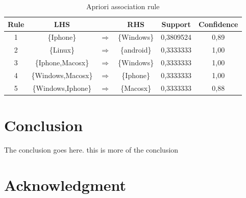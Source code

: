 \documentclass[10pt, conference]{IEEEtran}
\begin{document}
\begin{table}[h]
\renewcommand{\arraystretch}{1.3}
\caption{Apriori association rule}
\label{assocrule}
\centering
\begin{tabular}{|c|c c c|c|c|}
\hline
 Rule	&LHS & &RHS	& Support & Confidence \\
\hline
1&	\{Iphone\} 			&$\Rightarrow$	& 	\{Windows\} 	& 	0,3809524	&  	0,89	\\
\hline
2&	\{Linux\} 			& $\Rightarrow$ & 	\{android\} 	& 	0,3333333	&  	1,00 	\\
\hline
3&	\{Iphone,Macosx\}	&$\Rightarrow$	& 	\{Windows\} 	& 	0,3333333	& 	1,00	\\
\hline
4&	\{Windows,Macosx\} &$\Rightarrow$&  	\{Iphone\} 	& 	0,3333333	& 	1,00	\\
\hline
5&	\{Windows,Iphone\} &$\Rightarrow$& 		\{Macosx\} 	& 	0,3333333	&  	0,88	\\
\hline
\end{tabular}
\end{table} 





\section{Conclusion}
The conclusion goes here. this is more of the conclusion




\cite{bishop2006} %
\cite{Wojtczyk2008} %
\cite{Fahy2012} %
\cite{Nebeling2013} %
\cite{Sorensen2014} %
\cite{Dong2016} %



\section*{Acknowledgment}
\end{document}
